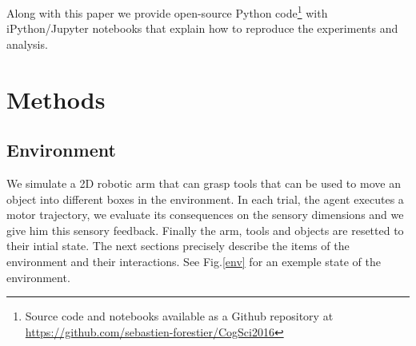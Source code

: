 \documentclass[10pt,letterpaper]{article}
\begin{document}
	Along with this paper we provide open-source Python code\footnote{Source code and notebooks available as a Github repository at \url{https://github.com/sebastien-forestier/CogSci2016}} 
	with iPython/Jupyter notebooks that explain how to reproduce the experiments and analysis. 
	
%

\section{Methods}

	\subsection{Environment}
	
		We simulate a 2D robotic arm that can grasp tools that can be used to move an object into different boxes in the environment. 		
		In each trial, the agent executes a motor trajectory, we evaluate its consequences on the sensory dimensions and we give him
		this sensory feedback. Finally the arm, tools and objects are resetted to their intial state.
		The next sections precisely describe the items of the environment and their interactions.	
		See Fig.\ref{env} for an exemple state of the environment. 
		
\end{document}
